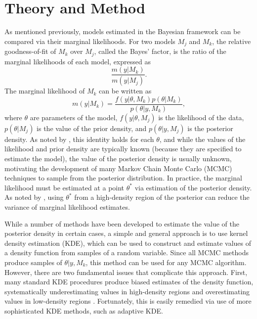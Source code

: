 \documentclass[twocolumn]{article}
\begin{document}
\section{Theory and Method}

As mentioned previously, models estimated in the Bayesian framework can be compared via their marginal likelihoods. For two models $M_j$ and $M_k$, the relative goodness-of-fit of $M_k$ over $M_j$, called the Bayes' factor, is the ratio of the marginal likelihoods of each model, expressed as
\begin{equation}
	\frac{m(y|M_k)}{m(y|M_j)}.
\end{equation}
The marginal likelihood of $M_k$ can be written as
\begin{equation}
	m(y|M_k) = \frac{f(y|\theta, M_k)p(\theta|M_k)}{p(\theta|y, M_k)},
\end{equation}
where $\theta$ are parameters of the model, $f(y|\theta, M_j)$ is the likelihood of the data, $p(\theta|M_j)$ is the value of the prior density, and $p(\theta|y, M_j)$ is the posterior density. As noted by \cite{Chib}, this identity holds for each $\theta$, and while the values of the likelihood and prior density are typically known (because they are specified to estimate the model), the value of the posterior density is usually unknown, motivating the development of many Markov Chain Monte Carlo (MCMC) techniques to sample from the posterior distribution. In practice, the marginal likelihood must be estimated at a point $\theta^*$ via estimation of the posterior density. As noted by \cite{Chib}, using $\theta^*$ from a high-density region of the posterior can reduce the variance of marginal likelihood estimates.

While a number of methods have been developed to estimate the value of the posterior density in certain cases, a simple and general approach is to use kernel density estimation (KDE), which can be used to construct and estimate values of a density function from samples of a random variable. Since all MCMC methods produce samples of $\theta|y, M_k$, this method can be used for any MCMC algorithm. However, there are two fundamental issues that complicate this approach. First, many standard KDE procedures produce biased estimates of the density function, systematically underestimating values in high-density regions and overestimating values in low-density regions \citep{SilvermanDE}. Fortunately, this is easily remedied via use of more sophisticated KDE methods, such as adaptive KDE.
\end{document}
